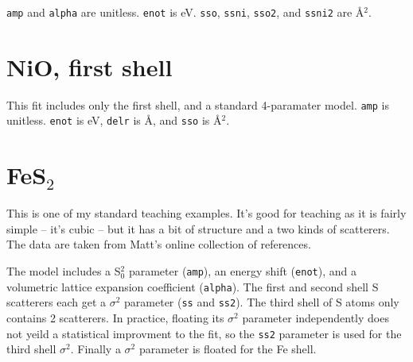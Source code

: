 \documentclass{article}
\let\stdsection\section
\renewcommand\section{\newpage\stdsection}
\begin{document}
\texttt{amp} and \texttt{alpha} are unitless.  \texttt{enot} is eV.
\texttt{sso}, \texttt{ssni}, \texttt{sso2}, and \texttt{ssni2} are
\AA$^2$.


\renewcommand{\feffmaterial}{NiO}
\renewcommand{\feffrone}{2.5}
\renewcommand{\feffrtwo}{3}
\renewcommand{\feffrthree}{3.7}
\renewcommand{\feffrfour}{4.2}
\renewcommand{\feffrfive}{4.7}
\renewcommand{\fefffirst}{}

\small

\fitplots




\section{NiO, first shell}

\normalsize
This fit includes only the first shell, and a standard 4-paramater
model.  \texttt{amp} is unitless.  \texttt{enot} is eV, \texttt{delr}
is \AA, and \texttt{sso} is \AA$^2$.


\renewcommand{\fefffirst}{_1st}

\small

\fitplots






\section{FeS$_2$}
\normalsize

This is one of my standard teaching examples.  It's good for teaching
as it is fairly simple -- it's cubic -- but it has a bit of structure
and a two kinds of scatterers.  The data are taken from Matt's online
collection of references.

The model includes a S$_0^2$ parameter (\texttt{amp}), an energy shift
(\texttt{enot}), and a volumetric lattice expansion coefficient
(\texttt{alpha}).  The first and second shell S scatterers each get a
$\sigma^2$ parameter (\texttt{ss} and \texttt{ss2}).  The third shell
of S atoms only contains 2 scatterers.  In practice, floating its
$\sigma^2$ parameter independently does not yeild a statistical
improvment to the fit, so the \texttt{ss2} parameter is used for the
third shell $\sigma^2$.  Finally a $\sigma^2$ parameter is floated for
the Fe shell.
\end{document}
